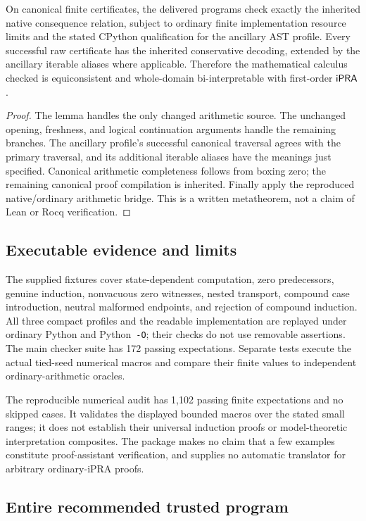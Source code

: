 \begin{theorem}
On canonical finite certificates, the delivered programs check exactly the inherited native consequence relation, subject to ordinary finite implementation resource limits and the stated CPython qualification for the ancillary AST profile. Every successful raw certificate has the inherited conservative decoding, extended by the ancillary iterable aliases where applicable. Therefore the mathematical calculus checked is equiconsistent and whole-domain bi-interpretable with first-order $\mathsf{iPRA}$.
\end{theorem}
\begin{proof}
The lemma handles the only changed arithmetic source. The unchanged opening, freshness, and logical continuation arguments handle the remaining branches. The ancillary profile's successful canonical traversal agrees with the primary traversal, and its additional iterable aliases have the meanings just specified. Canonical arithmetic completeness follows from boxing zero; the remaining canonical proof compilation is inherited. Finally apply the reproduced native/ordinary arithmetic bridge. This is a written metatheorem, not a claim of Lean or Rocq verification.
\end{proof}

\subsection{Executable evidence and limits}
The supplied fixtures cover state-dependent computation, zero predecessors, genuine induction, nonvacuous zero witnesses, nested transport, compound case introduction, neutral malformed endpoints, and rejection of compound induction. All three compact profiles and the readable implementation are replayed under ordinary Python and Python~\texttt{-O}; their checks do not use removable assertions. The main checker suite has 172 passing expectations. Separate tests execute the actual tied-seed numerical macros and compare their finite values to independent ordinary-arithmetic oracles.

The reproducible numerical audit has 1,102 passing finite expectations and no skipped cases. It validates the displayed bounded macros over the stated small ranges; it does not establish their universal induction proofs or model-theoretic interpretation composites. The package makes no claim that a few examples constitute proof-assistant verification, and supplies no automatic translator for arbitrary ordinary-iPRA proofs.

\Needspace{330pt}
\subsection{Entire recommended trusted program}

